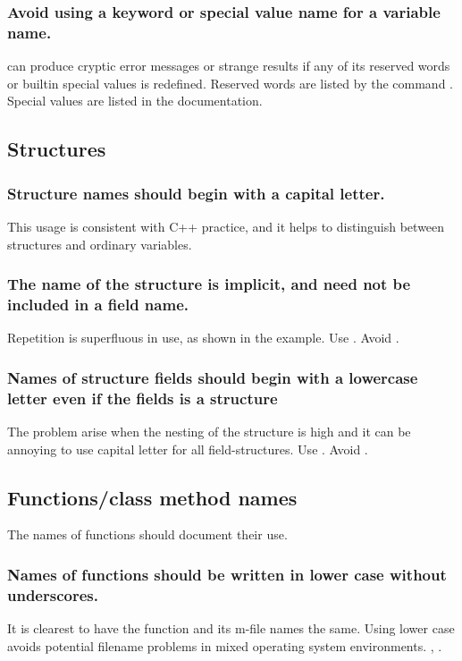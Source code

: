 \documentclass[titlepage,a4paper,12pt]{article}
\begin{document}
\subsubsection{Avoid using a keyword or special value name for a
variable name.}

 can produce cryptic error messages or strange
results if any of its reserved words or builtin special values is
redefined. Reserved words are listed by the command
. Special values are listed in the
documentation.


\subsection{Structures}
\subsubsection{Structure names should begin with a capital letter.}
This usage is consistent with C++ practice, and it helps to
distinguish between structures and ordinary variables.
\subsubsection{ The name of the structure is implicit, and need not
be included in a field name.} Repetition is superfluous in use, as
shown in the example. Use . Avoid
.
\subsubsection{Names of structure fields should begin with a
lowercase letter even if the fields is a structure} The problem
arise when the nesting of the structure is high and it can be
annoying to use capital letter for all field-structures. Use
. Avoid
.

\subsection{Functions/class method names}
 The names of functions should document their
use.
\subsubsection{Names of functions should be written in lower
case without underscores.}
 It is clearest to have the function and its m-file names the
same. Using lower case avoids potential filename problems in mixed
operating system environments. ,
.
\end{document}
